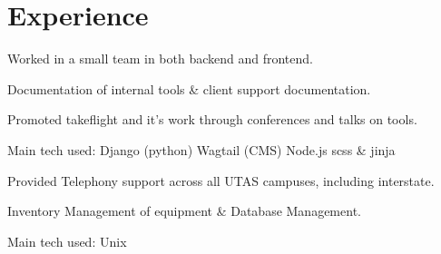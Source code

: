 \documentclass[a4paper]{deedy-resume} %
\begin{document}
\hfill
%
%
\begin{minipage}[t]{0.66\textwidth} %


\section{Experience}


\vspace{\topsep} %
\begin{tightitemize}
\item Worked in a small team in both backend and frontend.
\item Documentation of internal tools \& client support documentation.
\item Promoted takeflight and it's work through conferences and talks on tools.
\end{tightitemize}
Main tech used: \textbullet{} Django (python) \textbullet{} Wagtail (CMS) \textbullet{} Node.js \textbullet{} scss \& jinja

\sectionspace %



\begin{tightitemize}
\item Provided Telephony support across all UTAS campuses, including interstate.
\item Inventory Management of equipment \& Database Management.
\end{tightitemize}
Main tech used: \textbullet{} Unix


\end{minipage}
\end{document}
